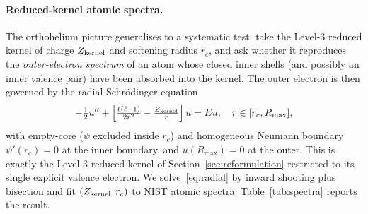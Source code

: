 \documentclass[11pt]{article}
\begin{document}
\paragraph{Reduced-kernel atomic spectra.}
The orthohelium picture generalises to a systematic test: take the Level-3 reduced kernel of charge $Z_{\rm kernel}$ and softening radius $r_c$, and ask whether it reproduces the \emph{outer-electron spectrum} of an atom whose closed inner shells (and possibly an inner valence pair) have been absorbed into the kernel. The outer electron is then governed by the radial Schr\"odinger equation
\begin{equation}
-\tfrac{1}{2} u'' + \left[ \tfrac{\ell(\ell+1)}{2 r^2} - \tfrac{Z_{\rm kernel}}{r} \right] u = E u, \quad r \in [r_c, R_{\max}],
\label{eq:radial}
\end{equation}
with empty-core ($\psi$ excluded inside $r_c$) and homogeneous Neumann boundary $\psi'(r_c) = 0$ at the inner boundary, and $u(R_{\max}) = 0$ at the outer. This is exactly the Level-3 reduced kernel of Section~\ref{sec:reformulation} restricted to its single explicit valence electron. We solve~\eqref{eq:radial} by inward shooting plus bisection and fit $(Z_{\rm kernel}, r_c)$ to NIST atomic spectra. Table~\ref{tab:spectra} reports the result.
\end{document}
